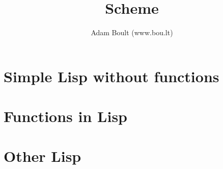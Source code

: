 \documentclass[oneside]{book}
\begin{document}
\author{Adam Boult (www.bou.lt)}
\title{Scheme}
\maketitle

\setcounter{tocdepth}{0}
\tableofcontents



\part{Simple Lisp without functions}





\part{Functions in Lisp}

\part{Other Lisp}
\end{document}
